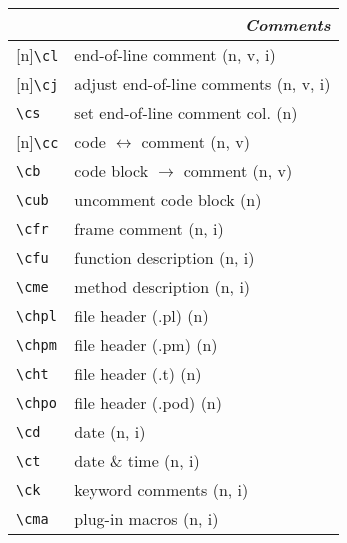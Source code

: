 \documentclass[oneside,10pt,landscape,DIV17]{scrartcl}
\newcommand{\Rep}{{\scriptsize{[n]}}}
\begin{document}
\begin{multicols}{3}
\begin{center}
\begin{tabular}[]{|p{11mm}|p{60mm}|}
\hline
\multicolumn{2}{|r|}{\textsl{\textbf{C}omments}}                       \\[1.0ex]
\hline \Rep\verb'\cl'   & end-of-line comment               \hfill (n, v, i)\\
\hline \Rep\verb'\cj'   & adjust end-of-line comments       \hfill (n, v, i)\\
\hline     \verb'\cs'   & set end-of-line comment col.      \hfill (n)      \\
%
\hline \Rep\verb'\cc'   & code $\leftrightarrow$ comment    \hfill (n, v)   \\
\hline     \verb'\cb'   & code block $\rightarrow$ comment  \hfill (n, v)   \\
\hline     \verb'\cub'  & uncomment code block              \hfill (n)      \\
%
\hline     \verb'\cfr'  & frame comment                     \hfill (n, i)   \\
\hline     \verb'\cfu'  & function description              \hfill (n, i)   \\
\hline     \verb'\cme'  & method description                \hfill (n, i)   \\
\hline     \verb'\chpl' & file header (.pl)                 \hfill (n)      \\
\hline     \verb'\chpm' & file header (.pm)                 \hfill (n)      \\
\hline     \verb'\cht'  & file header (.t)                  \hfill (n)      \\
\hline     \verb'\chpo' & file header (.pod)                \hfill (n)      \\
\hline     \verb'\cd'   & date                              \hfill (n, i)   \\
\hline     \verb'\ct'   & date \& time                      \hfill (n, i)   \\
\hline     \verb'\ck'   & keyword comments                  \hfill (n, i)   \\
\hline     \verb'\cma'  & plug-in macros                     \hfill (n, i)   \\
\hline
\end{tabular}\\
%
%

\end{center}
\end{multicols}
\end{document}
